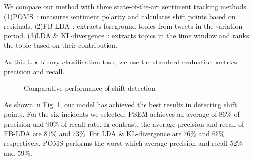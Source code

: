 \documentclass[runningheads]{llncs}
\begin{document}
We compare our method with three state-of-the-art sentiment tracking methods. (1)POMS~\cite{Bollen2011sentimentchange}: measures sentiment polarity and calculates shift points based on residuals. (2)FB-LDA~\cite{Tan2014topic}:  extracts foreground topics from tweets in the variation period. (3)LDA \& KL-divergence~\cite{Giachanou2016sentichange}: extracts topics in the time window and ranks the topic based on their contribution.

As this is a  binary classification task, we use the standard evaluation metrics:  precision and recall. 
\vspace{-0.8cm}
\begin{figure}
\centering
{}
\hspace{-4ex}
\setlength{\abovecaptionskip}{-0.1cm}
\caption{Comparative performance of shift detection}\label{fig:shift}
\end{figure}


As shown in Fig~\ref{fig:shift}, our model has achieved the best results in detecting shift points. For the six incidents we selected, PSEM achieves an average of $86\%$ of precision and $90\%$ of recall rate. In contrast, the average precision and recall of FB-LDA are $81\%$ and $73\%$. For LDA \& KL-divergence are $76\%$ and $68\%$ respectively. POMS performs the worst which average precision and recall  $52\%$ and $59\%$. %
\end{document}
